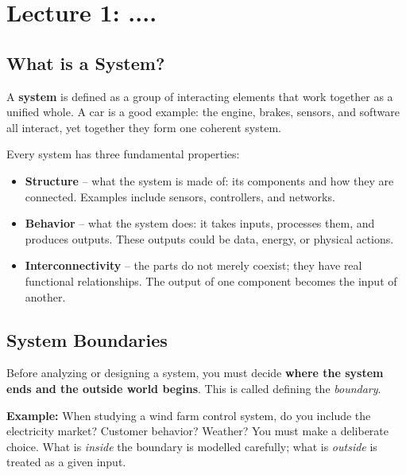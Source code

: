 \chapter{Lecture 1: ....}\label{lec:1}
\section{What is a System?}

A \textbf{system} is defined as a group of interacting elements that work together
as a unified whole. A car is a good example: the engine, brakes, sensors, and
software all interact, yet together they form one coherent system.

Every system has three fundamental properties:

\begin{itemize}[leftmargin=1.5em]
    \item \textbf{Structure} -- what the system is made of: its components and
    how they are connected. Examples include sensors, controllers, and networks.

    \item \textbf{Behavior} -- what the system does: it takes inputs, processes
    them, and produces outputs. These outputs could be data, energy, or physical
    actions.

    \item \textbf{Interconnectivity} -- the parts do not merely coexist; they
    have real functional relationships. The output of one component becomes the
    input of another.
\end{itemize}

\section{System Boundaries}

Before analyzing or designing a system, you must decide \textbf{where the system
ends and the outside world begins}. This is called defining the \emph{boundary}.

\begin{mdframed}[backgroundcolor=lightgray, linewidth=0pt, innertopmargin=8pt,
innerbottommargin=8pt]
\textbf{Example:} When studying a wind farm control system, do you include the
electricity market? Customer behavior? Weather? You must make a deliberate
choice. What is \emph{inside} the boundary is modelled carefully; what is
\emph{outside} is treated as a given input.
\end{mdframed}

